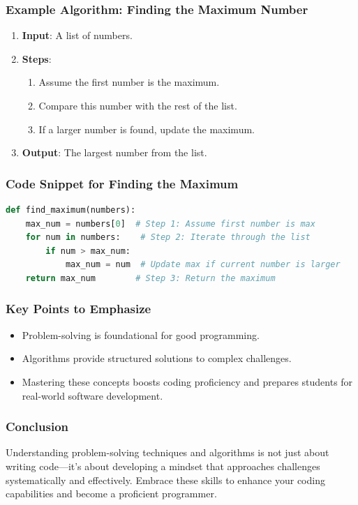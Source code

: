 \documentclass{beamer}
\begin{document}
\begin{frame}[fragile]
    \frametitle{Example Algorithm: Finding the Maximum Number}
    \begin{enumerate}
        \item \textbf{Input}: A list of numbers.
        \item \textbf{Steps}:
        \begin{enumerate}
            \item Assume the first number is the maximum.
            \item Compare this number with the rest of the list.
            \item If a larger number is found, update the maximum.
        \end{enumerate}
        \item \textbf{Output}: The largest number from the list.
    \end{enumerate}
\end{frame}

\begin{frame}[fragile]
    \frametitle{Code Snippet for Finding the Maximum}
    \begin{lstlisting}[language=Python]
def find_maximum(numbers):
    max_num = numbers[0]  # Step 1: Assume first number is max
    for num in numbers:    # Step 2: Iterate through the list
        if num > max_num:
            max_num = num  # Update max if current number is larger
    return max_num        # Step 3: Return the maximum
    \end{lstlisting}
\end{frame}

\begin{frame}[fragile]
    \frametitle{Key Points to Emphasize}
    \begin{itemize}
        \item Problem-solving is foundational for good programming.
        \item Algorithms provide structured solutions to complex challenges.
        \item Mastering these concepts boosts coding proficiency and prepares students for real-world software development.
    \end{itemize}
\end{frame}

\begin{frame}[fragile]
    \frametitle{Conclusion}
    Understanding problem-solving techniques and algorithms is not just about writing code—it's about developing a mindset that approaches challenges systematically and effectively. Embrace these skills to enhance your coding capabilities and become a proficient programmer.
\end{frame}
\end{document}
